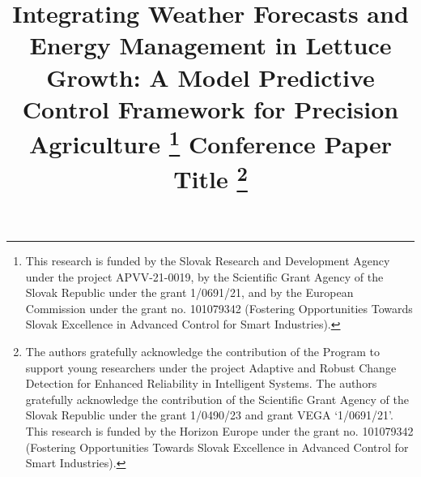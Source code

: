 \documentclass[conference]{IEEEtran}
\begin{document}
\title{Integrating Weather Forecasts and Energy Management in Lettuce Growth: A Model Predictive Control Framework for Precision Agriculture
    \thanks{This research is funded by the Slovak Research and Development Agency under the project APVV-21-0019, by the Scientific Grant Agency of the Slovak Republic under the grant 1/0691/21, and by the European Commission under the grant no. 101079342 (Fostering Opportunities Towards Slovak Excellence in Advanced Control for Smart Industries).}
}

\title{Conference Paper Title
    \thanks{The authors gratefully acknowledge the contribution of the Program to support young researchers under the project Adaptive and Robust Change Detection for Enhanced Reliability in Intelligent Systems. The authors gratefully acknowledge the contribution of the Scientific Grant Agency of the Slovak Republic under the grant 1/0490/23 and grant VEGA `1/0691/21'. This research is funded by the Horizon Europe under the grant no. 101079342 (Fostering Opportunities Towards Slovak Excellence in Advanced Control for Smart Industries).}
}

\author{
}

\maketitle
\end{document}
